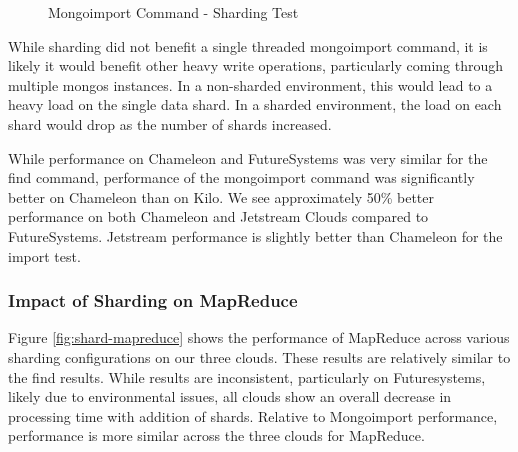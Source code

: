 \documentclass[sigconf]{acmart}
\begin{document}
\begin{figure}[htbp]
\centering
{}
\caption{Mongoimport Command - Sharding Test}
\label{fig:shard-import}
\end{figure}

While sharding did not benefit a single threaded mongoimport command,
it is likely it would benefit other heavy write operations,
particularly coming through multiple mongos instances.  In a
non-sharded environment, this would lead to a heavy load on the single
data shard.  In a sharded environment, the load on each shard would
drop as the number of shards increased.

While performance on Chameleon and FutureSystems was very similar for
the find command, performance of the mongoimport command was
significantly better on Chameleon than on Kilo.  We see approximately
50\% better performance on both Chameleon and Jetstream Clouds
compared to FutureSystems. Jetstream performance is slightly better
than Chameleon for the import test.


\subsubsection{Impact of Sharding on MapReduce}



Figure \ref{fig:shard-mapreduce} shows the performance of MapReduce
across various sharding configurations on our three clouds.  These
results are relatively similar to the find results.  While results are
inconsistent, particularly on Futuresystems, likely due to
environmental issues, all clouds show an overall decrease in
processing time with addition of shards.  Relative to Mongoimport
performance, performance is more similar across the three clouds for
MapReduce.
\end{document}
